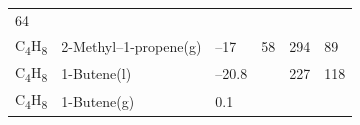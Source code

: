 \documentclass[
  9pt,
]{extbook}
\theoremstyle{definition}
\theoremstyle{definition}
\theoremstyle{definition}
\theoremstyle{remark}
\begin{document}
\begin{longtable}[]{@{}llllll@{}}
\begin{minipage}[t]{0.14\columnwidth}
64\strut
\end{minipage}\tabularnewline
\begin{minipage}[t]{0.07\columnwidth}\raggedright
C\textsubscript{4}H\textsubscript{8}\strut
\end{minipage} & \begin{minipage}[t]{0.17\columnwidth}\raggedright
2-Methyl--1-propene(g)\strut
\end{minipage} & \begin{minipage}[t]{0.15\columnwidth}\raggedright
--17\strut
\end{minipage} & \begin{minipage}[t]{0.15\columnwidth}\raggedright
58\strut
\end{minipage} & \begin{minipage}[t]{0.14\columnwidth}\raggedright
294\strut
\end{minipage} & \begin{minipage}[t]{0.14\columnwidth}\raggedright
89\strut
\end{minipage}\tabularnewline
\begin{minipage}[t]{0.07\columnwidth}\raggedright
C\textsubscript{4}H\textsubscript{8}\strut
\end{minipage} & \begin{minipage}[t]{0.17\columnwidth}\raggedright
1-Butene(l)\strut
\end{minipage} & \begin{minipage}[t]{0.15\columnwidth}\raggedright
--20.8\strut
\end{minipage} & \begin{minipage}[t]{0.15\columnwidth}\raggedright
\strut
\end{minipage} & \begin{minipage}[t]{0.14\columnwidth}\raggedright
227\strut
\end{minipage} & \begin{minipage}[t]{0.14\columnwidth}\raggedright
118\strut
\end{minipage}\tabularnewline
\begin{minipage}[t]{0.07\columnwidth}\raggedright
C\textsubscript{4}H\textsubscript{8}\strut
\end{minipage} & \begin{minipage}[t]{0.17\columnwidth}\raggedright
1-Butene(g)\strut
\end{minipage} & \begin{minipage}[t]{0.15\columnwidth}\raggedright
0.1\strut
\end{minipage} & \begin{minipage}[t]{0.15\columnwidth}\raggedright

\end{minipage}
\end{longtable}
\end{document}

